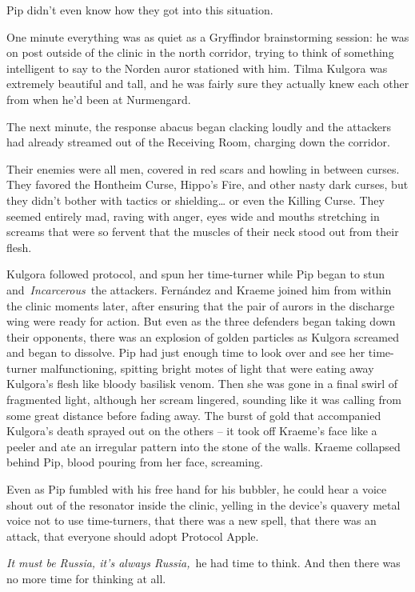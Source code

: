 Pip didn't even know how they got into this situation.

One minute everything was as quiet as a Gryffindor brainstorming
session: he was on post outside of the clinic in the north corridor,
trying to think of something intelligent to say to the Norden auror
stationed with him. Tilma Kulgora was extremely beautiful and tall, and
he was fairly sure they actually knew each other from when he'd been at
Nurmengard.

The next minute, the response abacus began clacking loudly and the
attackers had already streamed out of the Receiving Room, charging down
the corridor.

Their enemies were all men, covered in red scars and howling in between
curses. They favored the Hontheim Curse, Hippo's Fire, and other nasty
dark curses, but they didn't bother with tactics or shielding\ldots{} or
even the Killing Curse. They seemed entirely mad, raving with anger,
eyes wide and mouths stretching in screams that were so fervent that the
muscles of their neck stood out from their flesh.

Kulgora followed protocol, and spun her time-turner while Pip began to
stun and~\emph{Incarcerous}~the attackers. Fernández and Kraeme joined
him from within the clinic moments later, after ensuring that the pair
of aurors in the discharge wing were ready for action. But even as the
three defenders began taking down their opponents, there was an
explosion of golden particles as Kulgora screamed and began to dissolve.
Pip had just enough time to look over and see her time-turner
malfunctioning, spitting bright motes of light that were eating away
Kulgora's flesh like bloody basilisk venom. Then she was gone in a final
swirl of fragmented light, although her scream lingered, sounding like
it was calling from some great distance before fading away. The burst of
gold that accompanied Kulgora's death sprayed out on the others -- it
took off Kraeme's face like a peeler and ate an irregular pattern into
the stone of the walls. Kraeme collapsed behind Pip, blood pouring from
her face, screaming.

Even as Pip fumbled with his free hand for his bubbler, he could hear a
voice shout out of the resonator inside the clinic, yelling in the
device's quavery metal voice not to use time-turners, that there was a
new spell, that there was an attack, that everyone should adopt Protocol
Apple.

\emph{It must be Russia, it's always Russia,}~he had time to think. And
then there was no more time for thinking at all.

